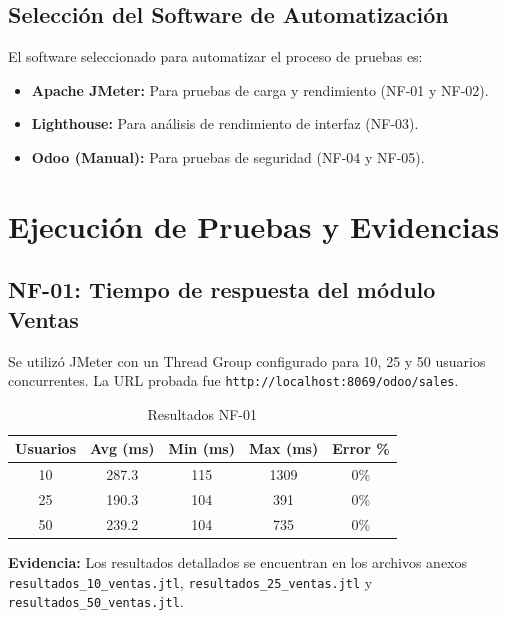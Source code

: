 \documentclass[12pt, letterpaper]{article}
\begin{document}
\subsection{Selección del Software de Automatización}

El software seleccionado para automatizar el proceso de pruebas es:

\begin{itemize}
    \item \textbf{Apache JMeter:} Para pruebas de carga y rendimiento (NF-01 y NF-02).
    \item \textbf{Lighthouse:} Para análisis de rendimiento de interfaz (NF-03).
    \item \textbf{Odoo (Manual):} Para pruebas de seguridad (NF-04 y NF-05).
\end{itemize}

\newpage

\section{Ejecución de Pruebas y Evidencias}

\subsection{NF-01: Tiempo de respuesta del módulo Ventas}

Se utilizó JMeter con un Thread Group configurado para 10, 25 y 50 usuarios concurrentes. La URL probada fue \texttt{http://localhost:8069/odoo/sales}.

\begin{table}[H]
\centering
\caption{Resultados NF-01}
\begin{tabular}{|c|c|c|c|c|}
\hline
\textbf{Usuarios} & \textbf{Avg (ms)} & \textbf{Min (ms)} & \textbf{Max (ms)} & \textbf{Error \%} \\
\hline
10 & 287.3 & 115 & 1309 & 0\% \\
25 & 190.3 & 104 & 391 & 0\% \\
50 & 239.2 & 104 & 735 & 0\% \\
\hline
\end{tabular}
\end{table}

\textbf{Evidencia:} Los resultados detallados se encuentran en los archivos anexos \texttt{resultados\_10\_ventas.jtl}, \texttt{resultados\_25\_ventas.jtl} y \texttt{resultados\_50\_ventas.jtl}.
\end{document}
